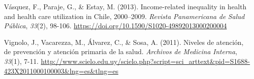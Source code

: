 \documentclass[
  spanish,
  a4paper,
  oneside]{scrbook}
\newlength{\cslhangindent}
\newenvironment{CSLReferences}[2] %
 {\begin{list}{}{%
  \setlength{\itemindent}{0pt}
  \setlength{\leftmargin}{0pt}
  \setlength{\parsep}{0pt}
  \ifodd #1
   \setlength{\leftmargin}{\cslhangindent}
   \setlength{\itemindent}{-1\cslhangindent}
  \fi
  \setlength{\itemsep}{#2\baselineskip}}}
 {\end{list}}
\begin{document}
\begin{CSLReferences}{1}{0}
Vásquez, F., Paraje, G., \& Estay, M. (2013). Income-related inequality
in health and health care utilization in {Chile}, 2000--2009.
\emph{Revista Panamericana de Salud Pública}, \emph{33}(2), 98-106.
\url{https://doi.org/10.1590/S1020-49892013000200004}

Vignolo, J., Vacarezza, M., Álvarez, C., \& Sosa, A. (2011). Niveles de
atención, de prevención y atención primaria de la salud. \emph{Archivos
de Medicina Interna}, \emph{33}(1), 7-11.
\url{http://www.scielo.edu.uy/scielo.php?script=sci_arttext&pid=S1688-423X2011000100003&lng=es&tlng=es}

\end{CSLReferences}


\backmatter

\mainmatter
\pagestyle{scrheadings}

\end{document}
